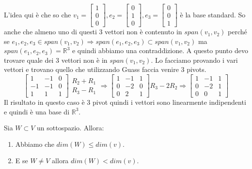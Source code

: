 \begin{example}
\begin{itemize}
    L'idea qui è che so che $v_1 = \begin{bmatrix}1\\0\\0\end{bmatrix}, e_2 = \begin{bmatrix}0\\1\\0\end{bmatrix}, e_3 = \begin{bmatrix}0\\0\\1\end{bmatrix}$ è la base standard. So anche che almeno uno di questi 3 vettori non è contenuto in $span(v_1, v_2)$ perché se $e_1, e_2, e_3 \in span(v_1, v_2) \Longrightarrow span(e_1, e_2, e_3) \subset span(v_1, v_2)$ ma $span(e_1, e_2, e_3) = \mathbb{R}^3$ e quindi abbiamo una contraddizione. A questo punto devo trovare quale dei 3 vettori non è in $span(v_1, v_2)$. Lo facciamo provando i vari vettori e trovano quello che utilizzando Guass faccia venire 3 pivots.
    \[
    \begin{bmatrix}
        1 & -1 & 0\\
        -1 & -1 & 0\\
        1 & 1 & 1
    \end{bmatrix}
    \begin{array}{l}
        R_2 + R_1\\
        R_3 - R_1
    \end{array}
    \Rightarrow
    \begin{bmatrix}
        1 & -1 & 1\\
        0 & -2 & 0\\
        0 & 2 & 1
    \end{bmatrix}
    R_3 - 2R_2
    \Rightarrow
    \begin{bmatrix}
        1 & -1 & 1\\
        0 & -2 & 1\\
        0 & 0 & 1
    \end{bmatrix}
    \]
    Il risultato in questo caso è 3 pivot quindi i vettori sono linearmente indipendenti e quindi è una base di $\mathbb{R}^3$.
\end{itemize}
\end{example}

\begin{proposition}
Sia $W \subset V$ un sottospazio. Allora:
\begin{enumerate}
    \item Abbiamo che $dim(W) \leq dim(v)$.
    \item E se $W \neq V$ allora $dim(W) < dim(v)$.
\end{enumerate}
\end{proposition}

